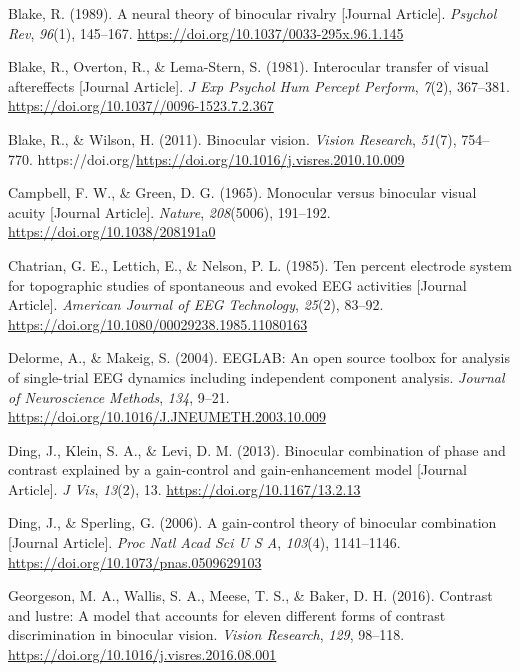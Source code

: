 \documentclass[
  12pt,
]{article}
\newlength{\cslhangindent}
\newenvironment{CSLReferences}[2] %
 {\begin{list}{}{%
  \setlength{\itemindent}{0pt}
  \setlength{\leftmargin}{0pt}
  \setlength{\parsep}{0pt}
  \ifodd #1
   \setlength{\leftmargin}{\cslhangindent}
   \setlength{\itemindent}{-1\cslhangindent}
  \fi
  \setlength{\itemsep}{#2\baselineskip}}}
 {\end{list}}
\begin{document}
\begin{CSLReferences}{1}{0}
Blake, R. (1989). A neural theory of binocular rivalry {[}Journal
Article{]}. \emph{Psychol Rev}, \emph{96}(1), 145--167.
\url{https://doi.org/10.1037/0033-295x.96.1.145}

Blake, R., Overton, R., \& Lema-Stern, S. (1981). Interocular transfer
of visual aftereffects {[}Journal Article{]}. \emph{J Exp Psychol Hum
Percept Perform}, \emph{7}(2), 367--381.
\url{https://doi.org/10.1037//0096-1523.7.2.367}

Blake, R., \& Wilson, H. (2011). Binocular vision. \emph{Vision
Research}, \emph{51}(7), 754--770.
https://doi.org/\url{https://doi.org/10.1016/j.visres.2010.10.009}

Campbell, F. W., \& Green, D. G. (1965). Monocular versus binocular
visual acuity {[}Journal Article{]}. \emph{Nature}, \emph{208}(5006),
191--192. \url{https://doi.org/10.1038/208191a0}

Chatrian, G. E., Lettich, E., \& Nelson, P. L. (1985). Ten percent
electrode system for topographic studies of spontaneous and evoked EEG
activities {[}Journal Article{]}. \emph{American Journal of EEG
Technology}, \emph{25}(2), 83--92.
\url{https://doi.org/10.1080/00029238.1985.11080163}

Delorme, A., \& Makeig, S. (2004). EEGLAB: An open source toolbox for
analysis of single-trial EEG dynamics including independent component
analysis. \emph{Journal of Neuroscience Methods}, \emph{134}, 9--21.
\url{https://doi.org/10.1016/J.JNEUMETH.2003.10.009}

Ding, J., Klein, S. A., \& Levi, D. M. (2013). Binocular combination of
phase and contrast explained by a gain-control and gain-enhancement
model {[}Journal Article{]}. \emph{J Vis}, \emph{13}(2), 13.
\url{https://doi.org/10.1167/13.2.13}

Ding, J., \& Sperling, G. (2006). A gain-control theory of binocular
combination {[}Journal Article{]}. \emph{Proc Natl Acad Sci U S A},
\emph{103}(4), 1141--1146. \url{https://doi.org/10.1073/pnas.0509629103}

Georgeson, M. A., Wallis, S. A., Meese, T. S., \& Baker, D. H. (2016).
Contrast and lustre: A model that accounts for eleven different forms of
contrast discrimination in binocular vision. \emph{Vision Research},
\emph{129}, 98--118. \url{https://doi.org/10.1016/j.visres.2016.08.001}


\end{CSLReferences}
\end{document}
